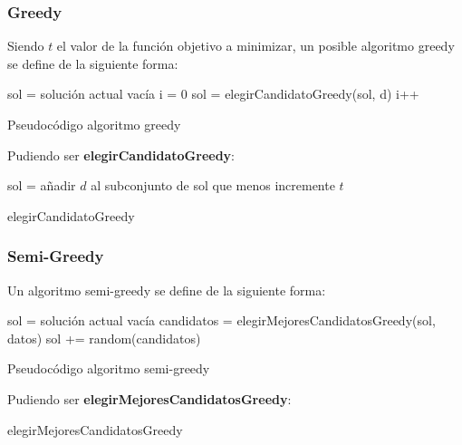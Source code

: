 \documentclass[13pt,a4paper]{article}
\begin{document}
\subsubsection{Greedy}

Siendo $t$ el valor de la función objetivo a minimizar, un posible algoritmo greedy se define de la siguiente forma:

\begin{algorithm}[H]
    \SetAlgoLined
        sol = solución actual vacía \;
        i = 0 \;
         {
            sol = elegirCandidatoGreedy(sol, d) \;
            i++ \;
        }        
    \caption{Pseudocódigo algoritmo greedy}
\end{algorithm}

\vspace{\baselineskip}

Pudiendo ser \textbf{elegirCandidatoGreedy}:

\begin{algorithm}[H]
    \SetAlgoLined
        sol = añadir $d$ al subconjunto de sol que menos incremente $t$ \;
    \caption{elegirCandidatoGreedy}
\end{algorithm}


\subsubsection{Semi-Greedy}

Un algoritmo semi-greedy se define de la siguiente forma:

\begin{algorithm}[H]
    \SetAlgoLined
        sol = solución actual vacía \;
         {
            candidatos = elegirMejoresCandidatosGreedy(sol, datos) \;
            sol += random(candidatos) \;
        }        
    \caption{Pseudocódigo algoritmo semi-greedy}
\end{algorithm}

\vspace{\baselineskip}

Pudiendo ser \textbf{elegirMejoresCandidatosGreedy}:

\begin{algorithm}[H]
    \SetAlgoLined
    \caption{elegirMejoresCandidatosGreedy}
\end{algorithm}
\end{document}
